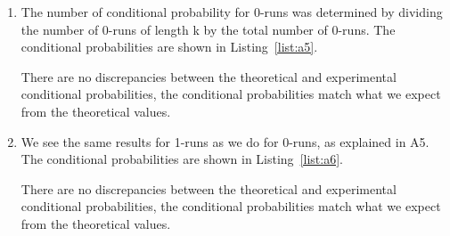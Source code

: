 \begin{enumerate}[wide, label=(A\arabic*)]
\item
The number of conditional probability for 0-runs was determined by dividing the number of 0-runs of length k by the total number of 0-runs. The conditional probabilities are shown in Listing~\ref{list:a5}.

There are no discrepancies between the theoretical and experimental conditional probabilities, the conditional probabilities match what we expect from the theoretical values.

\item
We see the same results for 1-runs as we do for 0-runs, as explained in A5. The conditional probabilities are shown in Listing~\ref{list:a6}.

There are no discrepancies between the theoretical and experimental conditional probabilities, the conditional probabilities match what we expect from the theoretical values.

\end{enumerate}


